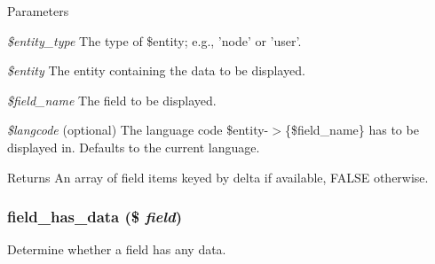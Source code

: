 \begin{DoxyParams}{Parameters}
\item[{\em \$entity\_\-type}]The type of \$entity; e.g., 'node' or 'user'. \item[{\em \$entity}]The entity containing the data to be displayed. \item[{\em \$field\_\-name}]The field to be displayed. \item[{\em \$langcode}](optional) The language code \$entity-\/$>$\{\$field\_\-name\} has to be displayed in. Defaults to the current language.\end{DoxyParams}
\begin{DoxyReturn}{Returns}
An array of field items keyed by delta if available, FALSE otherwise. 
\end{DoxyReturn}
\hypertarget{group__field_ga7545752dd04141d053f69416742a1ea4}{
\subsubsection[{field\_\-has\_\-data}]{\setlength{\rightskip}{0pt plus 5cm}field\_\-has\_\-data (\$ {\em field})}}
\label{group__field_ga7545752dd04141d053f69416742a1ea4}
Determine whether a field has any data.


